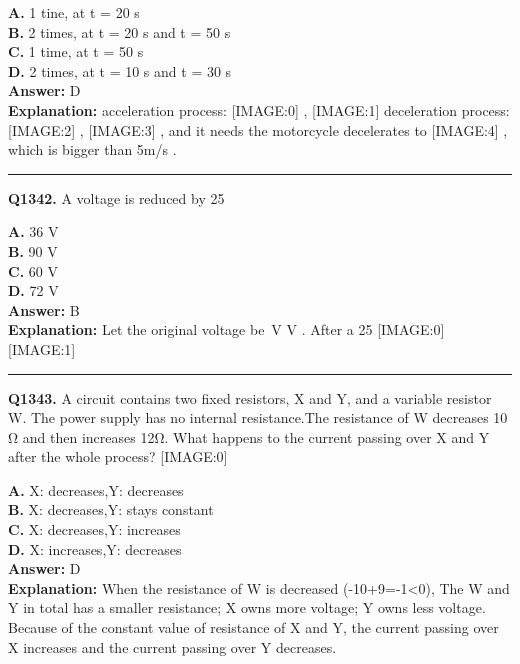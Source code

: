 \documentclass[12pt]{article}
\begin{document}
\textbf{A.} 1 tine, at t = 20 s \\
\textbf{B.} 2 times, at t = 20 s and t = 50 s \\
\textbf{C.} 1 time, at t = 50 s \\
\textbf{D.} 2 times, at t = 10 s and t = 30 s \\

\textbf{Answer:} D \\
\textbf{Explanation:} acceleration process:
[IMAGE:0]
,
[IMAGE:1]
deceleration process:
[IMAGE:2]
,
[IMAGE:3]
, and it needs the motorcycle decelerates to
[IMAGE:4]
, which is bigger than 5m/s
.

\hrule
\vspace{1em}


\noindent
\textbf{Q1342.} A voltage is reduced by 25%



\textbf{A.} 36 V \\
\textbf{B.} 90 V \\
\textbf{C.} 60 V \\
\textbf{D.} 72 V \\

\textbf{Answer:} B \\
\textbf{Explanation:} Let the original voltage be V
V
. After a 25%
[IMAGE:0]
[IMAGE:1]

\hrule
\vspace{1em}


\noindent
\textbf{Q1343.} A circuit contains two fixed resistors, X and Y, and a variable resistor W. The power supply has no internal resistance.The resistance of W decreases 10 Ω and then increases 12Ω. What happens to the current passing over X and Y after the whole process?
[IMAGE:0]



\textbf{A.} X: decreases,Y: decreases \\
\textbf{B.} X: decreases,Y: stays constant \\
\textbf{C.} X: decreases,Y: increases \\
\textbf{D.} X: increases,Y: decreases \\

\textbf{Answer:} D \\
\textbf{Explanation:} When the resistance of W is decreased (-10+9=-1<0), The W and Y in total has a smaller resistance; X owns more voltage; Y owns less voltage. Because of the constant value of resistance of X and Y, the current passing over X increases and the current passing over Y decreases.
\end{document}

